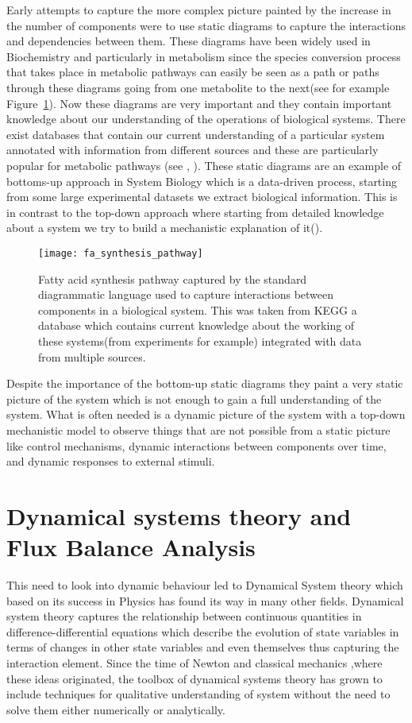 Early attempts to capture the more complex picture painted by the
increase in the number of components were to use static diagrams to
capture the interactions and dependencies between them. These diagrams
have been widely used in Biochemistry and particularly in metabolism
since the species conversion process that takes place in metabolic
pathways can easily be seen as a path or paths through these diagrams going from
one metabolite to the next(see for example
Figure~\ref{fig:fa_synthesis_pathway}). Now these diagrams are very important and
they contain important knowledge about our understanding of the
operations of biological systems. There exist databases that contain our current
understanding of a particular system annotated with information from
different sources and these are particularly popular for metabolic
pathways (see \citet{kanehisa2000kegg},
\citet{pharkya2003review}). These static diagrams are an example of
bottoms-up approach in System Biology which is a data-driven process,
starting from some large experimental datasets we extract biological
information. This is in contrast to the top-down approach where
starting from detailed knowledge about a system we try to build a
mechanistic explanation of it(\citet{schneider2013understanding}). 

\begin{figure}[htbp!] 
\centering    
\texttt{[image: fa\_synthesis\_pathway]}
\caption[Fatty Acid synthesis pathway]{Fatty acid synthesis pathway
  captured by the standard diagrammatic language used to capture
  interactions between components in a biological system. This was
  taken from KEGG a database which contains current knowledge about
  the working of these systems(from experiments for example)
  integrated with data from multiple sources.}
\label{fig:fa_synthesis_pathway}
\end{figure}

Despite the importance of the bottom-up static diagrams they paint a
very static picture of the system which is not enough to gain a full
understanding of the system. What is often needed is a dynamic picture
of the system with a top-down mechanistic model to observe things that
are not possible from a static
picture like control mechanisms, dynamic interactions between
components over time, and dynamic responses to external stimuli.


\section{Dynamical systems theory and Flux Balance Analysis}
This need to look into dynamic behaviour led to Dynamical System
theory which based on its success in Physics has found its way in many
other fields. Dynamical system theory captures the relationship
between continuous quantities in difference-differential equations
which describe the evolution of state variables in terms of changes
in other state variables and even themselves thus capturing the
interaction element. Since the time of Newton and classical mechanics
,where these ideas originated, the toolbox of dynamical systems theory
has grown to include techniques for qualitative understanding of
system without the need to solve them either numerically or analytically.



